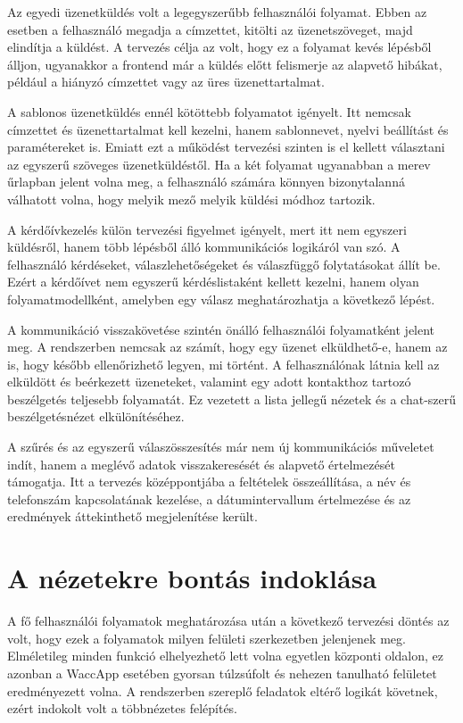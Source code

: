 Az egyedi üzenetküldés volt a legegyszerűbb felhasználói folyamat. Ebben az esetben a felhasználó megadja a címzettet, kitölti az üzenetszöveget, majd elindítja a küldést. A tervezés célja az volt, hogy ez a folyamat kevés lépésből álljon, ugyanakkor a frontend már a küldés előtt felismerje az alapvető hibákat, például a hiányzó címzettet vagy az üres üzenettartalmat.

A sablonos üzenetküldés ennél kötöttebb folyamatot igényelt. Itt nemcsak címzettet és üzenettartalmat kell kezelni, hanem sablonnevet, nyelvi beállítást és paramétereket is. Emiatt ezt a működést tervezési szinten is el kellett választani az egyszerű szöveges üzenetküldéstől. Ha a két folyamat ugyanabban a merev űrlapban jelent volna meg, a felhasználó számára könnyen bizonytalanná válhatott volna, hogy melyik mező melyik küldési módhoz tartozik.

A kérdőívkezelés külön tervezési figyelmet igényelt, mert itt nem egyszeri küldésről, hanem több lépésből álló kommunikációs logikáról van szó. A felhasználó kérdéseket, válaszlehetőségeket és válaszfüggő folytatásokat állít be. Ezért a kérdőívet nem egyszerű kérdéslistaként kellett kezelni, hanem olyan folyamatmodellként, amelyben egy válasz meghatározhatja a következő lépést.

A kommunikáció visszakövetése szintén önálló felhasználói folyamatként jelent meg. A rendszerben nemcsak az számít, hogy egy üzenet elküldhető-e, hanem az is, hogy később ellenőrizhető legyen, mi történt. A felhasználónak látnia kell az elküldött és beérkezett üzeneteket, valamint egy adott kontakthoz tartozó beszélgetés teljesebb folyamatát. Ez vezetett a lista jellegű nézetek és a chat-szerű beszélgetésnézet elkülönítéséhez.

A szűrés és az egyszerű válaszösszesítés már nem új kommunikációs műveletet indít, hanem a meglévő adatok visszakeresését és alapvető értelmezését támogatja. Itt a tervezés középpontjába a feltételek összeállítása, a név és telefonszám kapcsolatának kezelése, a dátumintervallum értelmezése és az eredmények áttekinthető megjelenítése került.

\section{A nézetekre bontás indoklása}

A fő felhasználói folyamatok meghatározása után a következő tervezési döntés az volt, hogy ezek a folyamatok milyen felületi szerkezetben jelenjenek meg. Elméletileg minden funkció elhelyezhető lett volna egyetlen központi oldalon, ez azonban a WaccApp esetében gyorsan túlzsúfolt és nehezen tanulható felületet eredményezett volna. A rendszerben szereplő feladatok eltérő logikát követnek, ezért indokolt volt a többnézetes felépítés.

